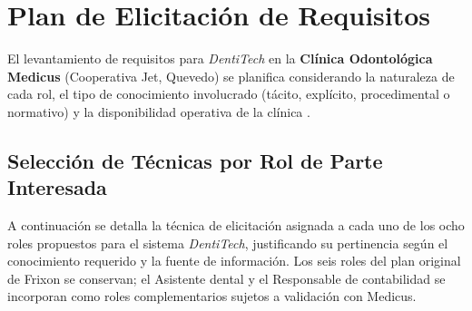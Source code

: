
\section{Plan de Elicitaci{\'o}n de Requisitos}

El levantamiento de requisitos para \textit{DentiTech} en la \textbf{Cl{\'i}nica Odontol{\'o}gica Medicus} (Cooperativa Jet, Quevedo) se planifica considerando la naturaleza de cada rol, el tipo de conocimiento involucrado (t{\'a}cito, expl{\'i}cito, procedimental o normativo) y la disponibilidad operativa de la cl{\'i}nica \cite{iso29148, pohl2025}.

\subsection{Selecci{\'o}n de T{\'e}cnicas por Rol de Parte Interesada}

A continuaci{\'o}n se detalla la t{\'e}cnica de elicitaci{\'o}n asignada a cada uno de los ocho roles propuestos para el sistema \textit{DentiTech}, justificando su pertinencia seg{\'u}n el conocimiento requerido y la fuente de informaci{\'o}n. Los seis roles del plan original de Frixon se conservan; el Asistente dental y el Responsable de contabilidad se incorporan como roles complementarios sujetos a validaci{\'o}n con Medicus.

